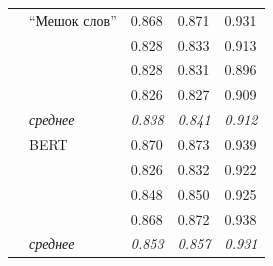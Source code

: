 \begin{table}[H]
\begin{center}
\begin{tabular}{|p{3cm}|p{4cm}|p{2.4cm}|p{2.4cm}|p{2.4cm}|}
			\multirow{8}{*}{\shortstack[l]{Перцептрон}} 
			& ``Мешок слов'' & 0.868 & 0.871 & 0.931 \\
				& & 0.828 & 0.833 & 0.913 \\
				& & 0.828 & 0.831 & 0.896 \\
				& & 0.826 & 0.827 & 0.909 \\
				\cline{2-5} & \textit{среднее} & \textit{0.838} & \textit{0.841} & \textit{0.912} \\
			\cline{2-5}
			& BERT & 0.870 & 0.873 & 0.939 \\
				& & 0.826 & 0.832 & 0.922 \\
				& & 0.848 & 0.850 & 0.925 \\
				& & 0.868 & 0.872 & 0.938 \\
				\cline{2-5} & \textit{среднее} & \textit{0.853} & \textit{0.857} & \textit{0.931} \\
					
			\hline
		\end{tabular}
	\end{center}
\end{table}